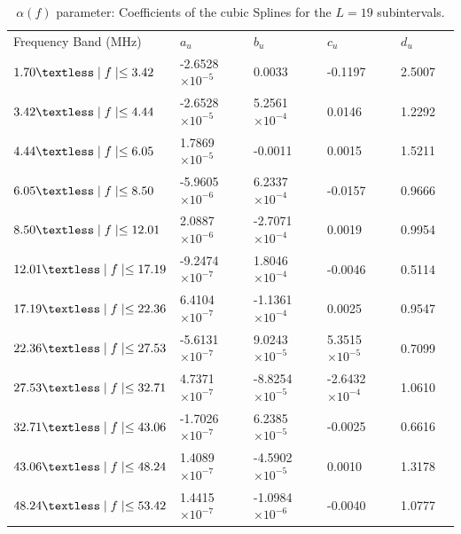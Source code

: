 \documentclass[journal]{IEEEtran}
\begin{document}
\begin{table}[h]
	\setlength\extrarowheight{4.5pt}
	\centering
	\caption{$\alpha(f)$ parameter: Coefficients of the cubic Splines for the $L=19$ subintervals.}
	\label{table_alfa}
	\begin{tabular}{|C{4cm}|C{3cm}|C{3cm}|C{3cm}|C{3cm}|m{0cm}}
		Frequency Band (MHz)           		   & $a_u$    			  & $b_u$      			 & $c_u$   		 		& $d_u$&\\ 
		$1.70\textless \mid f\mid \leq 3.42$   & -2.6528 $\times 10^{-5}$ & 0.0033  				 & -0.1197 					& 2.5007 &\\ 
		$3.42\textless \mid f\mid \leq 4.44$   & -2.6528 $\times 10^{-5}$ & 5.2561 $\times 10^{-4}$  & 0.0146  					& 1.2292 &\\ 
		$4.44\textless \mid f\mid \leq 6.05$   & 1.7869  $\times 10^{-5}$ & -0.0011                  & 0.0015                   & 1.5211 &\\ 
		$6.05\textless \mid f\mid \leq 8.50$   & -5.9605 $\times 10^{-6}$ & 6.2337 $\times 10^{-4}$  & -0.0157                  & 0.9666 &\\ 
		$8.50\textless \mid f\mid \leq 12.01$  & 2.0887  $\times 10^{-6}$ & -2.7071 $\times 10^{-4}$ & 0.0019 					& 0.9954 &\\ 
		$12.01\textless \mid f\mid \leq 17.19$ & -9.2474 $\times 10^{-7}$ & 1.8046 $\times 10^{-4}$  & -0.0046 					& 0.5114 &\\ 
		$17.19\textless \mid f\mid \leq 22.36$ & 6.4104  $\times 10^{-7}$ & -1.1361 $\times 10^{-4}$ & 0.0025  					& 0.9547 &\\ 
		$22.36\textless \mid f\mid \leq 27.53$ & -5.6131 $\times 10^{-7}$ & 9.0243 $\times 10^{-5}$  & 5.3515 $\times 10^{-5}$  & 0.7099 &\\ 
		$27.53\textless \mid f\mid \leq 32.71$ & 4.7371  $\times 10^{-7}$ & -8.8254 $\times 10^{-5}$ & -2.6432 $\times 10^{-4}$ & 1.0610 &\\ 
		$32.71\textless \mid f\mid \leq 43.06$ & -1.7026 $\times 10^{-7}$ & 6.2385 $\times 10^{-5}$  & -0.0025 					& 0.6616 &\\ 
		$43.06\textless \mid f\mid \leq 48.24$ & 1.4089  $\times 10^{-7}$ & -4.5902 $\times 10^{-5}$ & 0.0010  					& 1.3178 &\\ 
		$48.24\textless \mid f\mid \leq 53.42$ & 1.4415  $\times 10^{-7}$ & -1.0984 $\times 10^{-6}$ & -0.0040 					& 1.0777 &\\ 

\end{tabular}
\end{table}
\end{document}
